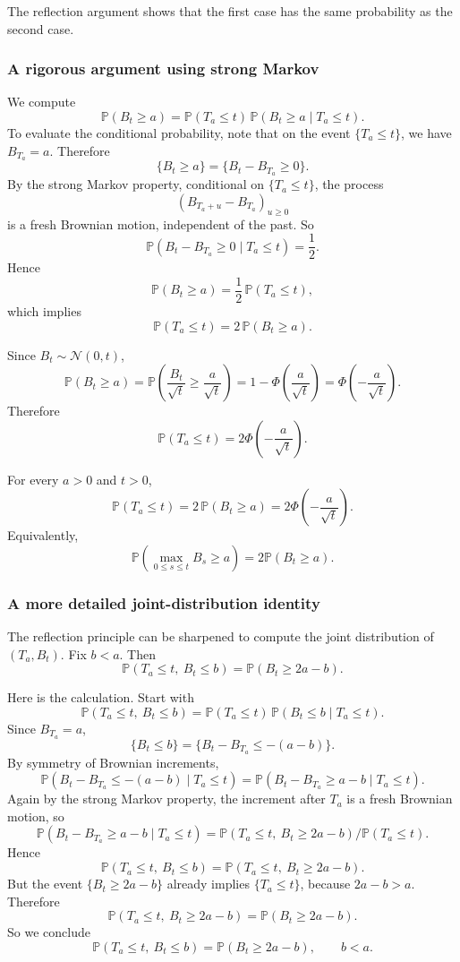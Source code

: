 \documentclass[11pt]{article}
\theoremstyle{definition}
\begin{document}
The reflection argument shows that the first case has the same probability as the second case.

\subsubsection{A rigorous argument using strong Markov}

We compute
\[
\mathbb P(B_t\ge a)
=
\mathbb P(T_a\le t)\,\mathbb P(B_t\ge a\mid T_a\le t).
\]
To evaluate the conditional probability, note that on the event \(\{T_a\le t\}\), we have \(B_{T_a}=a\). Therefore
\[
\{B_t\ge a\}
=
\{B_t-B_{T_a}\ge 0\}.
\]
By the strong Markov property, conditional on \(\{T_a\le t\}\), the process
\[
(B_{T_a+u}-B_{T_a})_{u\ge 0}
\]
is a fresh Brownian motion, independent of the past. So
\[
\mathbb P(B_t-B_{T_a}\ge 0\mid T_a\le t)=\frac12.
\]
Hence
\[
\mathbb P(B_t\ge a)=\frac12\,\mathbb P(T_a\le t),
\]
which implies
\[
\mathbb P(T_a\le t)=2\,\mathbb P(B_t\ge a).
\]

Since \(B_t\sim\mathcal N(0,t)\),
\[
\mathbb P(B_t\ge a)
=
\mathbb P\!\left(\frac{B_t}{\sqrt t}\ge \frac{a}{\sqrt t}\right)
=
1-\Phi\!\left(\frac{a}{\sqrt t}\right)
=
\Phi\!\left(-\frac{a}{\sqrt t}\right).
\]
Therefore
\[
\mathbb P(T_a\le t)=2\Phi\!\left(-\frac{a}{\sqrt t}\right).
\]

\begin{keyformula}
For every \(a>0\) and \(t>0\),
\[
\mathbb P(T_a\le t)
=
2\,\mathbb P(B_t\ge a)
=
2\Phi\!\left(-\frac{a}{\sqrt t}\right).
\]
Equivalently,
\[
\mathbb P\!\left(\max_{0\le s\le t} B_s\ge a\right)
=
2\mathbb P(B_t\ge a).
\]
\end{keyformula}

\subsubsection{A more detailed joint-distribution identity}

The reflection principle can be sharpened to compute the joint distribution of \((T_a,B_t)\). Fix \(b<a\). Then
\[
\mathbb P(T_a\le t,\ B_t\le b)
=
\mathbb P(B_t\ge 2a-b).
\]

Here is the calculation. Start with
\[
\mathbb P(T_a\le t,\ B_t\le b)
=
\mathbb P(T_a\le t)\,\mathbb P(B_t\le b\mid T_a\le t).
\]
Since \(B_{T_a}=a\),
\[
\{B_t\le b\}
=
\{B_t-B_{T_a}\le -(a-b)\}.
\]
By symmetry of Brownian increments,
\[
\mathbb P(B_t-B_{T_a}\le -(a-b)\mid T_a\le t)
=
\mathbb P(B_t-B_{T_a}\ge a-b\mid T_a\le t).
\]
Again by the strong Markov property, the increment after \(T_a\) is a fresh Brownian motion, so
\[
\mathbb P(B_t-B_{T_a}\ge a-b\mid T_a\le t)
=
\mathbb P(T_a\le t,\ B_t\ge 2a-b)\Big/\mathbb P(T_a\le t).
\]
Hence
\[
\mathbb P(T_a\le t,\ B_t\le b)
=
\mathbb P(T_a\le t,\ B_t\ge 2a-b).
\]
But the event \(\{B_t\ge 2a-b\}\) already implies \(\{T_a\le t\}\), because \(2a-b>a\). Therefore
\[
\mathbb P(T_a\le t,\ B_t\ge 2a-b)
=
\mathbb P(B_t\ge 2a-b).
\]
So we conclude
\[
\mathbb P(T_a\le t,\ B_t\le b)=\mathbb P(B_t\ge 2a-b),
\qquad b<a.
\]
\end{document}
